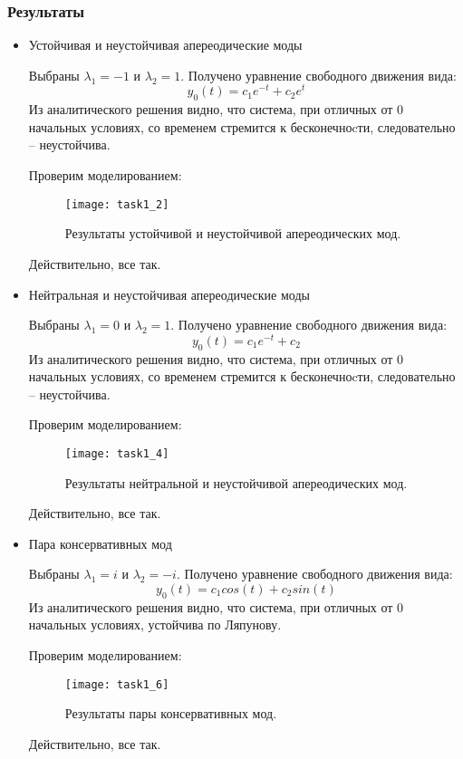 \documentclass[16pt]{article}
\begin{document}
\subsubsection{Результаты}
\begin{itemize}
    \item Устойчивая и неустойчивая апереодические моды 
    

    Выбраны \(\lambda_1 = -1\) и \(\lambda_2 = 1\). Получено уравнение свободного движения вида:
    \[y_0(t)= c_1 e^{-t} + c_2 e^t\]
    Из аналитического решения видно, что система, при отличных от 0 начальных условиях, со временем стремится к бесконечноcти, следовательно -- неустойчива.
    
    
    Проверим моделированием:

    \begin{figure}[H]
        \centering
        \texttt{[image: task1\_2]}
        \caption{Результаты устойчивой и неустойчивой апереодических мод.}
        \label{fig:fig1}
    \end{figure}

    Действительно, все так.

    \item Нейтральная и неустойчивая апереодические моды 
    
    
    Выбраны \(\lambda_1 = 0\) и \(\lambda_2 = 1\). Получено уравнение свободного движения вида:
    \[y_0(t)= c_1 e^{-t} + c_2\]
    Из аналитического решения видно, что система, при отличных от 0 начальных условиях, со временем стремится к бесконечноcти, следовательно -- неустойчива.
    
    
    Проверим моделированием:

    \begin{figure}[H]
        \centering
        \texttt{[image: task1\_4]}
        \caption{Результаты нейтральной и неустойчивой апереодических мод.}
        \label{fig:fig2}
    \end{figure}

    Действительно, все так.

    \item Пара консервативных мод
    
    
    Выбраны \(\lambda_1 = i\) и \(\lambda_2 = -i\). Получено уравнение свободного движения вида:
    \[y_0(t)= c_1 cos(t) + c_2 sin(t)\]
    Из аналитического решения видно, что система, при отличных от 0 начальных условиях, устойчива по Ляпунову.
    
    
    Проверим моделированием:

    \begin{figure}[H]
        \centering
        \texttt{[image: task1\_6]}
        \caption{Результаты пары консервативных мод.}
        \label{fig:fig3}
    \end{figure}

    Действительно, все так.
\end{itemize}
\end{document}
